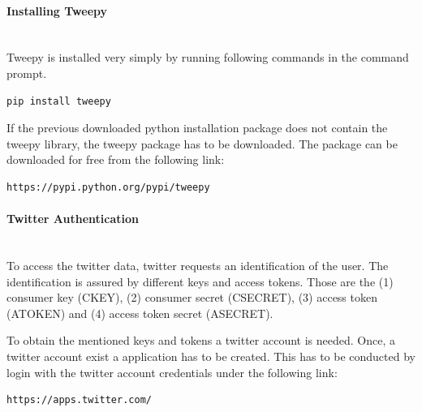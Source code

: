\documentclass[a4paper,12pt]{article}
\begin{document}
\begin{spacing}{1.2}
\paragraph{Installing Tweepy}\mbox{}\\{}
Tweepy is installed very simply by running following commands in the command prompt. 
\begin{lstlisting}[language=bash]
pip install tweepy
\end{lstlisting}

If the previous downloaded python installation package does not contain the tweepy library, the tweepy package has to be downloaded. The package can be downloaded for free from the following link:
\begin{lstlisting}[language=bash]
https://pypi.python.org/pypi/tweepy
\end{lstlisting}

\paragraph{Twitter Authentication}\mbox{}\\{}
To access the twitter data, twitter requests an identification of the user. The identification is assured by different keys and access tokens. Those are the (1) consumer key (CKEY), (2) consumer secret (CSECRET), (3) access token (ATOKEN) and (4) access token secret (ASECRET). \parencite{twitterinc2017b}

To obtain the mentioned keys and tokens a twitter account is needed. Once, a twitter account exist a application has to be created. This has to be conducted by login with the twitter account credentials under the following link: 
\begin{lstlisting}[language=bash]
https://apps.twitter.com/
\end{lstlisting}


\end{spacing}
\end{document}
